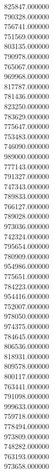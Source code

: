 825847.000000\\
790328.000000\\
756741.000000\\
751569.000000\\
803135.000000\\
790978.000000\\
765067.000000\\
969968.000000\\
817787.000000\\
781436.000000\\
823250.000000\\
783629.000000\\
775647.000000\\
753483.000000\\
746090.000000\\
989000.000000\\
777143.000000\\
791327.000000\\
747343.000000\\
789833.000000\\
766127.000000\\
789028.000000\\
973036.000000\\
742324.000000\\
795654.000000\\
780909.000000\\
954986.000000\\
775651.000000\\
784223.000000\\
954416.000000\\
752007.000000\\
978050.000000\\
974375.000000\\
784645.000000\\
806536.000000\\
818931.000000\\
809578.000000\\
800117.000000\\
763441.000000\\
791098.000000\\
999633.000000\\
759718.000000\\
778494.000000\\
973809.000000\\
748282.000000\\
763193.000000\\
973658.000000\\
